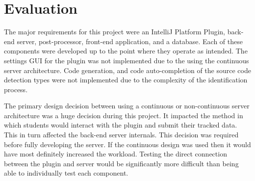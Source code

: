 \chapter{Evaluation}





The major requirements for this project were an IntelliJ Platform Plugin, back-end server, post-processor, front-end application, and a database. Each of these components were developed up to the point where they operate as intended. The settings GUI for the plugin was not implemented due to the using the continuous server architecture. Code generation, and code auto-completion of the source code detection types were not implemented due to the complexity of the identification process.

The primary design decision between using a continuous or non-continuous server architecture was a huge decision during this project. It impacted the method in which students would interact with the plugin and submit their tracked data. This in turn affected the back-end server internals. This decision was required before fully developing the server. If the continuous design was used then it would have most definitely increased the workload. Testing the direct connection between the plugin and server would be significantly more difficult than being able to individually test each component.

